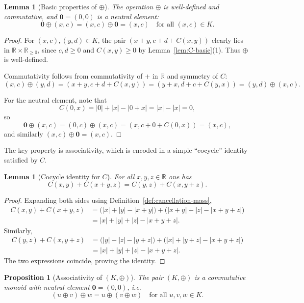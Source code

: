 \documentclass[11pt]{amsart}
\numberwithin{equation}{section}
\newtheorem{proposition}[theorem]{Proposition}
\newtheorem{lemma}[theorem]{Lemma}
\theoremstyle{definition}
\theoremstyle{remark}
\newcommand{\R}{\mathbb{R}}
\newcommand{\Kamb}{K}                      %
\newcommand{\Cfun}{C}                      %
\begin{document}
\begin{lemma}[Basic properties of $\oplus$]\label{lem:oplus-basic}
The operation $\oplus$ is well-defined and commutative, and
$\mathbf{0}=(0,0)$ is a neutral element:
\[
  \mathbf{0}\oplus(x,c) = (x,c)\oplus\mathbf{0} = (x,c)
  \quad\text{for all }(x,c)\in\Kamb.
\]
\end{lemma}

\begin{proof}
For $(x,c),(y,d)\in\Kamb$, the pair $(x+y,c+d+\Cfun(x,y))$ clearly
lies in $\R\times\R_{\ge0}$, since $c,d\ge0$ and $\Cfun(x,y)\ge0$ by
Lemma~\ref{lem:C-basic}(1).  Thus $\oplus$ is well-defined.

Commutativity follows from commutativity of $+$ in $\R$ and symmetry
of $\Cfun$:
\[
  (x,c)\oplus(y,d)
  = (x+y,c+d+\Cfun(x,y))
  = (y+x,d+c+\Cfun(y,x))
  = (y,d)\oplus(x,c).
\]

For the neutral element, note that
\[
  \Cfun(0,x) = |0|+|x|-|0+x| = |x|-|x| = 0,
\]
so
\[
  \mathbf{0}\oplus(x,c)
  = (0,c)\oplus(x,c)
  = (x,c+0+\Cfun(0,x))
  = (x,c),
\]
and similarly $(x,c)\oplus\mathbf{0}=(x,c)$.
\end{proof}

The key property is associativity, which is encoded in a simple
``cocycle'' identity satisfied by $\Cfun$.

\begin{lemma}[Cocycle identity for $\Cfun$]\label{lem:C-cocycle}
For all $x,y,z\in\R$ one has
\[
  \Cfun(x,y)+\Cfun(x+y,z)
  = \Cfun(y,z)+\Cfun(x,y+z).
\]
\end{lemma}

\begin{proof}
Expanding both sides using Definition~\ref{def:cancellation-mass},
\begin{align*}
  \Cfun(x,y)+\Cfun(x+y,z)
  &= \bigl(|x|+|y|-|x+y|\bigr)
   + \bigl(|x+y|+|z|-|x+y+z|\bigr)\\
  &= |x|+|y|+|z|-|x+y+z|.
\end{align*}
Similarly,
\begin{align*}
  \Cfun(y,z)+\Cfun(x,y+z)
  &= \bigl(|y|+|z|-|y+z|\bigr)
   + \bigl(|x|+|y+z|-|x+y+z|\bigr)\\
  &= |x|+|y|+|z|-|x+y+z|.
\end{align*}
The two expressions coincide, proving the identity.
\end{proof}

\begin{proposition}[Associativity of $(\Kamb,\oplus)$]
\label{prop:Kamb-assoc}
The pair $(\Kamb,\oplus)$ is a commutative monoid with neutral element
$\mathbf{0}=(0,0)$, i.e.
\[
  (u\oplus v)\oplus w = u\oplus(v\oplus w)
  \quad\text{for all }u,v,w\in\Kamb.
\]
\end{proposition}
\end{document}
